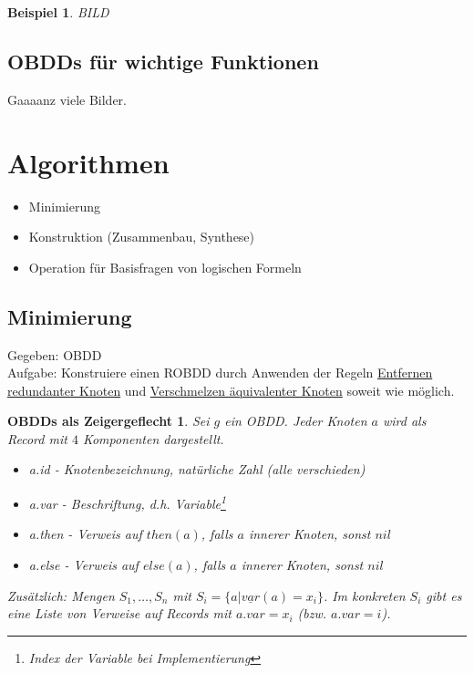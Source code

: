 \documentclass[ngerman]{scrartcl}
\theoremstyle{custom}
\newtheorem{mex}[mdef]{Beispiel}
\newtheorem{obdd}[mdef]{OBDDs als Zeigergeflecht}
\newcommand{\0}{\mathbf{0}}
\newcommand{\1}{\mathbf{L}}
\begin{document}
\begin{mex}
BILD
\end{mex}

\subsection{OBDDs f\"ur wichtige Funktionen}
Gaaaanz viele Bilder.

\newpage

\section{Algorithmen}
\begin{itemize}
\item Minimierung
\item Konstruktion (Zusammenbau, Synthese)
\item Operation f\"ur
Basisfragen von logischen Formeln
\end{itemize}

\subsection{Minimierung}
Gegeben: OBDD\\
Aufgabe: Konstruiere einen ROBDD durch Anwenden der Regeln
\hyperref[regel:entf]{\glqq Entfernen redundanter Knoten\grqq} und
\hyperref[regel:verschm]{\glqq Verschmelzen \"aquivalenter Knoten\grqq} soweit wie
  m\"oglich.

\begin{obdd}
Sei $g$ ein OBDD. Jeder Knoten $a$ wird als \emph{Record} mit $4$
Komponenten dargestellt.
\begin{itemize}
\item[(1)] a.id - Knotenbezeichnung, nat\"urliche Zahl (alle
  verschieden)
\item[(2)] a.var - Beschriftung, d.h. Variable\footnote{Index der
    Variable bei Implementierung}
\item[(3)] a.then - Verweis auf $then(a)$, falls $a$ innerer Knoten,
  sonst $nil$
\item[(4)] a.else - Verweis auf $else(a)$, falls $a$ innerer Knoten,
  sonst $nil$
\end{itemize}
Zus\"atzlich: Mengen $S_1,\dots,S_n$ mit $S_i=\{ a \vert
\underline{var}(a)=x_i\}$. Im konkreten $S_i$ gibt es eine Liste von
Verweise auf Records mit $a.var = x_i$ (bzw. $a.var = i$).
\end{obdd}
\end{document}
